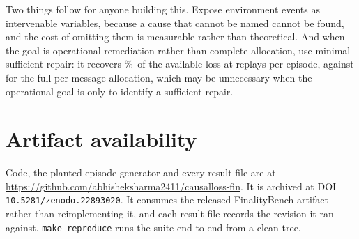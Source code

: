 \documentclass[conference]{IEEEtran}
\begin{document}
Two things follow for anyone building this. Expose environment events as
intervenable variables, because a cause that cannot be named cannot be found,
and the cost of omitting them is measurable rather than theoretical. And when
the goal is operational remediation rather than complete allocation, use
minimal sufficient repair: it recovers \minSuffRepair\%\ of the available loss
at \minSuffReplays{} replays per episode, against \shapleyReplays{} for the
full per-message allocation, which may be unnecessary when the operational
goal is only to identify a sufficient repair.

\section*{Artifact availability}

Code, the planted-episode generator and every result file are at
\url{https://github.com/abhisheksharma2411/causalloss-fin}. It is archived at DOI \texttt{10.5281/zenodo.22893020}. It consumes the released
FinalityBench artifact~\cite{finalitybench} rather than reimplementing it, and
each result file records the revision it ran against. \texttt{make reproduce}
runs the suite end to end from a clean tree.
\end{document}
